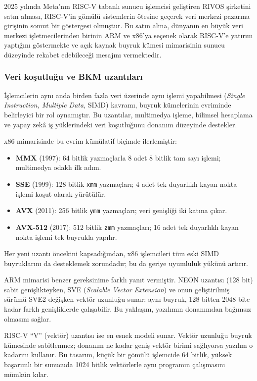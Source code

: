 2025 yılında Meta'nın RISC-V tabanlı sunucu işlemcisi geliştiren RIVOS şirketini satın alması, RISC-V'in gömülü sistemlerin ötesine geçerek veri merkezi pazarına girişinin somut bir göstergesi olmuştur. Bu satın alma, dünyanın en büyük veri merkezi işletmecilerinden birinin ARM ve x86'ya seçenek olarak RISC-V'e yatırım yaptığını göstermekte ve açık kaynak buyruk kümesi mimarisinin sunucu düzeyinde rekabet edebileceği mesajını vermektedir.

\subsubsection*{Veri koşutluğu ve BKM uzantıları}
İşlemcilerin aynı anda birden fazla veri üzerinde aynı işlemi yapabilmesi (\emph{Single Instruction, Multiple Data}, SIMD) kavramı, buyruk kümelerinin evriminde belirleyici bir rol oynamıştır. Bu uzantılar, multimedya işleme, bilimsel hesaplama ve yapay zekâ iş yüklerindeki veri koşutluğunu donanım düzeyinde destekler.

x86 mimarisinde bu evrim kümülatif biçimde ilerlemiştir:
\begin{itemize}[nosep]
\item \textbf{MMX} (1997): 64 bitlik yazmaçlarla 8 adet 8 bitlik tam sayı işlemi; multimedya odaklı ilk adım.
\item \textbf{SSE} (1999): 128 bitlik \texttt{xmm} yazmaçları; 4 adet tek duyarlıklı kayan nokta işlemi koşut olarak yürütülür.
\item \textbf{AVX} (2011): 256 bitlik \texttt{ymm} yazmaçları; veri genişliği iki katına çıkar.
\item \textbf{AVX-512} (2017): 512 bitlik \texttt{zmm} yazmaçları; 16 adet tek duyarlıklı kayan nokta işlemi tek buyrukla yapılır.
\end{itemize}

Her yeni uzantı öncekini kapsadığından, x86 işlemcileri tüm eski SIMD buyruklarını da desteklemek zorundadır; bu da geriye uyumluluk yükünü artırır.

ARM mimarisi benzer gereksinime farklı yanıt vermiştir. NEON uzantısı (128 bit) sabit genişlikteyken, SVE (\emph{Scalable Vector Extension}) ve onun geliştirilmiş sürümü SVE2 değişken vektör uzunluğu sunar: aynı buyruk, 128 bitten 2048 bite kadar farklı genişliklerde çalışabilir. Bu yaklaşım, yazılımın donanımdan bağımsız olmasını sağlar.

RISC-V ``V'' (vektör) uzantısı ise en esnek modeli sunar. Vektör uzunluğu buyruk kümesinde sabitlenmez; donanım ne kadar geniş vektör birimi sağlıyorsa yazılım o kadarını kullanır. Bu tasarım, küçük bir gömülü işlemcide 64 bitlik, yüksek başarımlı bir sunucuda 1024 bitlik vektörlerle aynı programın çalışmasını mümkün kılar.

